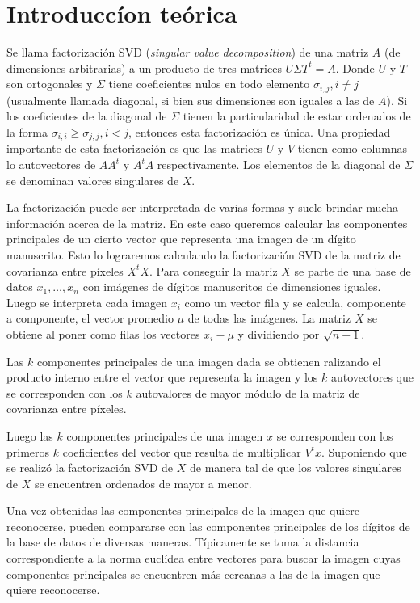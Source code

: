 \section{Introducc\'ion te\'orica}

	\PARstart Se llama factorizaci\'on SVD (\textit{singular value decomposition})
	de una matriz $A$ (de dimensiones arbitrarias) a un producto de tres matrices
	$U\Sigma T^{t} = A$. Donde $U$ y $T$ son ortogonales y $\Sigma$ tiene
	coeficientes nulos en todo elemento $\sigma_{i,j}, i\neq j$ (usualmente
	llamada diagonal, si bien sus dimensiones son iguales a las de $A$).
	Si los coeficientes de la diagonal de $\Sigma$ tienen
	la particularidad de estar ordenados de la forma $\sigma_{i,i} \geq
	\sigma_{j,j}, i<j$, entonces esta factorizaci\'on es \'unica.
	Una propiedad importante de esta factorizaci\'on es que las matrices
	$U$ y $V$ tienen como columnas lo autovectores de $AA^t$ y $A^tA$
	respectivamente.
	Los elementos de la diagonal de $\Sigma$ se denominan valores singulares
	de $X$.

	La factorizaci\'on puede ser interpretada de varias formas y suele
	brindar mucha informaci\'on acerca de la matriz. En este caso queremos
	calcular las componentes principales de un cierto vector que representa
	una imagen de un d\'igito manuscrito. Esto lo lograremos calculando la
	factorizaci\'on SVD de la matriz de covarianza entre p\'ixeles $X^tX$.
	Para conseguir la matriz $X$ se parte de una base de datos $x_1, \ldots, x_n$
	con im\'agenes
	de d\'igitos manuscritos de dimensiones iguales. Luego se interpreta cada
	imagen $x_i$ como un vector fila y se calcula, componente a componente,
	el vector promedio $\mu$ de todas las im\'agenes.
	La matriz $X$ se obtiene al poner como filas los vectores $x_i - \mu$
	y dividiendo por $\sqrt{n-1}$.

	Las $k$ componentes principales de una imagen dada se obtienen ralizando
	el producto interno entre el vector que representa la imagen y los
	$k$ autovectores que se corresponden con los $k$ autovalores de mayor m\'odulo
	de la matriz de covarianza entre p\'ixeles.

	Luego las $k$ componentes principales de una imagen $x$ se corresponden con los
	primeros $k$ coeficientes del vector que resulta de multiplicar $V^tx$.
	Suponiendo que se realiz\'o la factorizaci\'on SVD de $X$ de manera tal
	de que los valores singulares de $X$ se encuentren ordenados de mayor a menor. 

	Una vez obtenidas las componentes principales de la imagen que quiere
	reconocerse, pueden compararse con las componentes principales de los
	d\'igitos de la base de datos de diversas maneras. T\'ipicamente se toma
	la distancia correspondiente a la norma eucl\'idea entre vectores para
	buscar la imagen cuyas componentes principales se encuentren m\'as cercanas
	a las de la imagen que quiere reconocerse.
